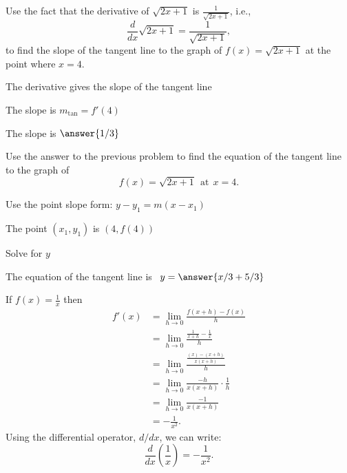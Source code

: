 \documentclass{ximera}
\begin{document}
\begin{problem} %
Use the fact that the derivative of $\sqrt{2x+1}$ is $\frac{1}{\sqrt{2x+1}}$,
i.e., 
\[
\frac{d}{dx}\sqrt{2x+1} = \frac{1}{\sqrt{2x+1}},
\]
to find the slope of the tangent line to the graph of 
$f(x) = \sqrt{2x+1}$ at the point where $x = 4$.\\
\begin{hint}
The derivative gives the slope of the tangent line
\end{hint}
\begin{hint}
The slope is $m_{\text{tan}} = f'(4)$
\end{hint}
The slope is $\answer{1/3}$
\end{problem}





\begin{problem} %
Use the answer to the previous problem to find the equation of the tangent line to the graph of 
\[
f(x) = \sqrt{2x+1} \ \ \text{at} \ \ x=4.
\]
\begin{hint}
Use the point slope form: $y-y_1 = m(x-x_1)$
\end{hint}
\begin{hint}
The point $(x_1,y_1)$ is $(4, f(4))$
\end{hint}
\begin{hint}
Solve for $y$
\end{hint}
The equation of the tangent line is \ $y = \answer{x/3 + 5/3}$
\end{problem}



\begin{example}[example 6]
If $f(x) = \displaystyle{\frac{1}{x}}$ then
\begin{align*}
f'(x) &= \lim_{h \to 0} \frac{f(x+h)-f(x)}{h}\\[5pt]
&= \lim_{h \to 0} \frac{\frac{1}{x+h}- \frac{1}{x}}{h}\\[5pt]
&= \lim_{h \to 0} \frac{\frac{(x) - (x+h)}{x(x+h)}}{h} \\[5pt]
&=  \lim_{h \to 0} \frac{-h}{x(x+h)}\cdot \frac{1}{h}\\[5pt]
&= \lim_{h \to 0} \frac{-1}{x(x+h)} \\[5pt]
&= -\frac{1}{x^2}.
\end{align*}
Using the differential operator, $d/dx$, we can write:
\[
 \frac{d}{dx}\left({\frac{1}{x}}\right) = -\frac{1}{x^2}.
\]
\end{example}
\end{document}
